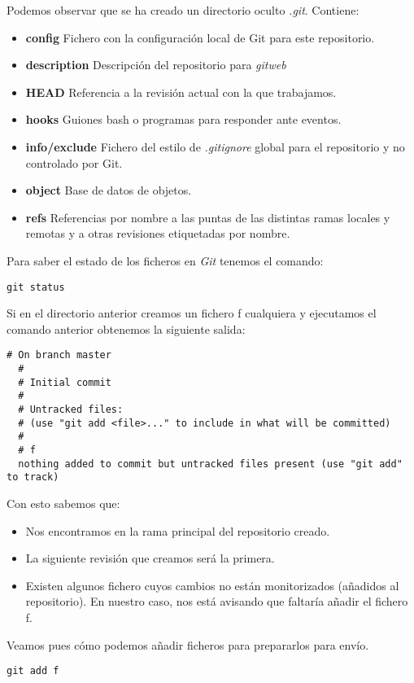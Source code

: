 Podemos observar que se ha creado un directorio oculto
\textit{.git}. Contiene:
\begin{itemize}
  \item \textbf{config} Fichero con la configuración local de Git para
    este repositorio.
  \item \textbf{description} Descripción del repositorio para
    \textit{gitweb}
  \item \textbf{HEAD} Referencia a la revisión actual con la que
    trabajamos.
  \item \textbf{hooks} Guiones bash o programas para responder ante
    eventos.
  \item \textbf{info/exclude} Fichero del estilo de
    \textit{.gitignore} global para el repositorio y no controlado
    por Git.
  \item \textbf{object} Base de datos de objetos.
  \item \textbf{refs} Referencias por nombre a las puntas de las
    distintas ramas locales y remotas y a otras revisiones etiquetadas
    por nombre. 
\end{itemize}

Para saber el estado de los ficheros en \textit{Git} tenemos el
comando:
\begin{lstlisting}[style=consola]
  git status
\end{lstlisting}

Si en el directorio anterior creamos un fichero f cualquiera y
ejecutamos el comando anterior obtenemos la siguiente salida:
\begin{lstlisting}[style=consola]
  # On branch master
  #
  # Initial commit
  #
  # Untracked files:
  # (use "git add <file>..." to include in what will be committed)
  #
  # f
  nothing added to commit but untracked files present (use "git add" to track)
\end{lstlisting}

Con esto sabemos que:
\begin{itemize}
  \item Nos encontramos en la rama principal del repositorio creado.
  \item La siguiente revisión que creamos será la primera.
  \item Existen algunos fichero cuyos cambios no están monitorizados
    (añadidos al repositorio). En nuestro caso, nos está avisando que
    faltaría añadir el fichero f.
\end{itemize}

Veamos pues cómo podemos añadir ficheros para prepararlos para envío.
\begin{lstlisting}[style=consola]
  git add f
\end{lstlisting}

